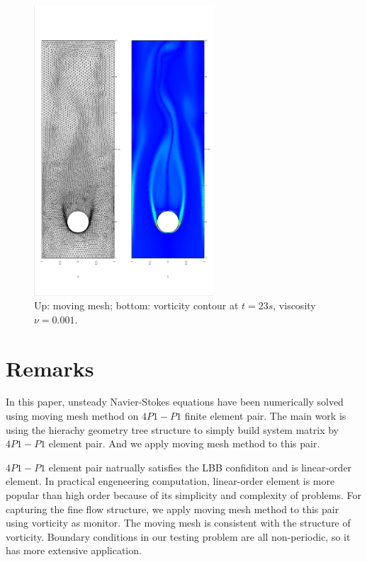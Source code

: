 \documentclass[a4paper, 11pt]{article}
\begin{document}
    \begin{figure}[!htbp]
        \centering
        \includegraphics[width = 0.6\textwidth, angle = -90]{picture/obstacle_flow_data/mesh_t_23s.eps}
        \caption{\small Up: moving mesh; bottom: vorticity contour at
          $t = 23s$, viscosity $\nu = 0.001$.}
        \label{fig::cylinder_mesh_t23s}
    \end{figure}


   \section{Remarks}

   In this paper, unsteady Navier-Stokes equations have been numerically 
   solved using moving mesh method on $4P1-P1$ finite element
   pair. The main work is using the hierachy geometry tree structure
   to simply build system matrix by $4P1-P1$ element pair. And we
   apply moving mesh method to this pair. 
    
   $4P1-P1$ element pair natrually satisfies the LBB confiditon and is
   linear-order element. In practical engeneering computation,
   linear-order element is more popular than high order because of its
   simplicity and complexity of problems. For capturing the fine flow
   structure, we apply moving mesh method to this pair using vorticity
   as monitor. The moving mesh is consistent with the structure of
   vorticity. Boundary conditions in our testing problem are all
   non-periodic, so it has more extensive application.
   
\end{document}
